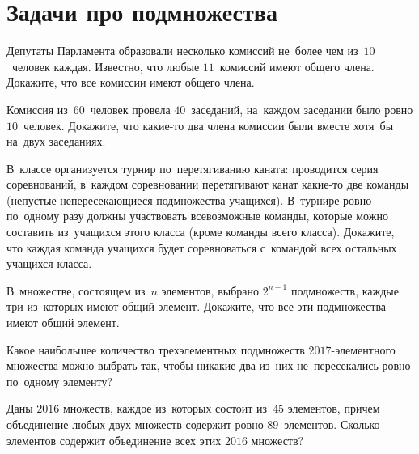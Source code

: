 
\section*{Задачи про подмножества}


\begin{problems}

\item
Депутаты Парламента образовали несколько комиссий не~более чем из~$10$~человек
каждая.
Известно, что любые $11$~комиссий имеют общего члена.
Докажите, что все комиссии имеют общего члена.

\item
Комиссия из~$60$~человек провела $40$~заседаний, на~каждом заседании было ровно
$10$~человек.
Докажите, что какие-то два члена комиссии были вместе хотя~бы на~двух
заседаниях.

\item
В~классе организуется турнир по~перетягиванию каната: проводится серия
соревнований, в~каждом соревновании перетягивают канат какие-то две команды
(непустые непересекающиеся подмножества учащихся).
В~турнире ровно по~одному разу должны участвовать всевозможные команды, которые
можно составить из~учащихся этого класса (кроме команды всего класса).
Докажите, что каждая команда учащихся будет соревноваться с~командой всех
остальных учащихся класса.

\item
В~множестве, состоящем из~$n$ элементов, выбрано $2^{n-1}$ подмножеств, каждые
три из~которых имеют общий элемент.
Докажите, что все эти подмножества имеют общий элемент.


\item
Какое наибольшее количество трехэлементных подмножеств $2017$-элементного
множества можно выбрать так, чтобы никакие два из~них не~пересекались ровно
по~одному элементу?

\item
Даны $2016$ множеств, каждое из~которых состоит из~$45$ элементов, причем
объединение любых двух множеств содержит ровно $89$~элементов.
Сколько элементов содержит объединение всех этих $2016$ множеств?


\end{problems}
